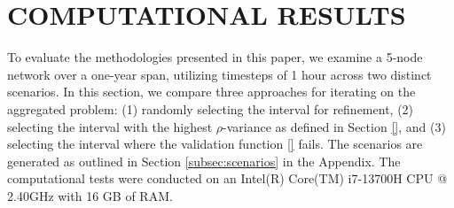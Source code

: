 \section{COMPUTATIONAL RESULTS}\label{section: comp res}
{
\color{purple}

To evaluate the methodologies presented in this paper, we examine a  5-node network over a one-year span, utilizing timesteps of 1 hour across two distinct scenarios.
 In this section, we compare three approaches for iterating on the aggregated problem: (1) randomly selecting the interval for refinement, 
 (2) selecting the interval with the highest \(\rho\)-variance as defined in Section \ref{}, and (3) selecting the interval where the validation function \ref{} fails. 
 The scenarios are generated as outlined in Section \ref{subsec:scenarios} in the Appendix. 
 The computational tests were conducted on an Intel(R) Core(TM) i7-13700H CPU @ 2.40GHz with 16 GB of RAM.

}
